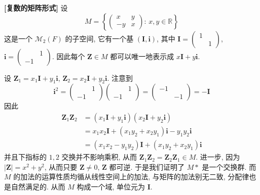 \documentclass[UTF8]{book}
\begin{document}
\begin{example}
    \textbf{[复数的矩阵形式]} 
    设 $$M=\left\{\begin{pmatrix}
        x & y \\
        -y & x
    \end{pmatrix}:\,x,y \in \mathbb{R}\right\}$$ 
    这是一个 $\mathcal{M}_{2}(F)$ 的子空间, 
    它有一个基 $(\boldsymbol{I},\boldsymbol{i})$, 
    其中 $\boldsymbol{I}=\begin{pmatrix} 1& \\ &1  \end{pmatrix}$, 
    $\boldsymbol{i} = \begin{pmatrix}& 1 \\ -1 & \end{pmatrix}$. 
    因此每个 $\boldsymbol{Z}\in M$ 
    都可以唯一地表示成 $x\boldsymbol{I}+y\boldsymbol{i}$. 

    设 $\boldsymbol{Z}_1 = x_1\boldsymbol{I}+y_1\boldsymbol{i}$, 
    $\boldsymbol{Z}_2 = x_2\boldsymbol{I}+y_2\boldsymbol{i}$. 
    注意到 
    $$
    \boldsymbol{i}^2 = \begin{pmatrix} & 1 \\ -1 &  \end{pmatrix}
    \begin{pmatrix} & 1 \\ -1 & \end{pmatrix} = 
    \begin{pmatrix} -1& \\ &-1  \end{pmatrix} = 
    -\boldsymbol{I}
    $$
    因此 
    $$\begin{aligned}
        \boldsymbol{Z}_1\boldsymbol{Z}_2 
        &=  (x_1\boldsymbol{I}+y_1\boldsymbol{i})
        (x_2\boldsymbol{I}+y_2\boldsymbol{i}) \\
        &= x_1x_2\boldsymbol{I} + (x_1y_2+x_2y_1)\boldsymbol{i}
        -y_1y_2\boldsymbol{i}\\
        &= (x_1x_2-y_1y_2)\boldsymbol{I} + 
        (x_1y_2+x_2y_1)\boldsymbol{i}
    \end{aligned}$$
    并且下指标的 $1,2$ 交换并不影响乘积, 从而 
    $ \boldsymbol{Z}_1\boldsymbol{Z}_2 = 
    \boldsymbol{Z}_2\boldsymbol{Z}_1 \in M$. 
    进一步, 因为 $|\boldsymbol{Z}|=x^2 +y^2$, 
    从而只要 $\boldsymbol{Z}\neq 0$, $\boldsymbol{Z}$ 都可逆. 
    于是我们证明了 $M*$ 是一个交换群. 
    而 $M$ 的加法的运算性质均循从线性空间上的加法, 
    与矩阵的加法别无二致, 分配律也是自然满足的. 
    从而 $M$ 构成一个域, 单位元为 $\boldsymbol{I}$. 


\end{example}
\end{document}

